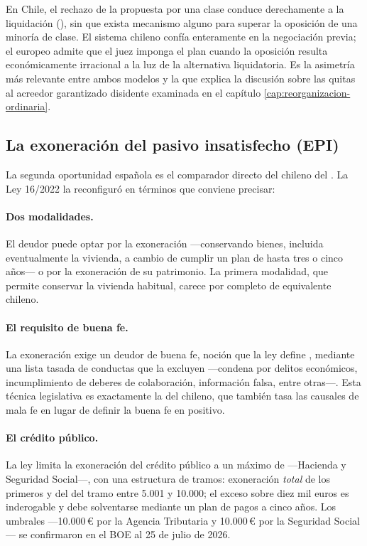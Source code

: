 \begin{alerta}
En Chile, el rechazo de la propuesta por una clase conduce derechamente a la liquidación
(), sin que exista mecanismo alguno para superar la oposición de una minoría de clase.
El sistema chileno confía enteramente en la negociación previa; el europeo admite que el juez
imponga el plan cuando la oposición resulta económicamente irracional a la luz de la alternativa
liquidatoria. Es la asimetría más relevante entre ambos modelos y la que explica la discusión sobre
las quitas al acreedor garantizado disidente examinada en el capítulo
\ref{cap:reorganizacion-ordinaria}.
\end{alerta}

\subsection{La exoneración del pasivo insatisfecho (EPI)}

La segunda oportunidad española es el comparador directo del \discharge{} chileno del . La
Ley 16/2022 la reconfiguró en términos que conviene precisar:

\paragraph{Dos modalidades.} El deudor puede optar por la exoneración
 ---conservando bienes, incluida eventualmente la vivienda, a cambio de
cumplir un plan de hasta tres o cinco años--- o por la exoneración
 de su patrimonio. La primera modalidad, que permite conservar la
vivienda habitual, carece por completo de equivalente chileno.

\paragraph{El requisito de buena fe.} La exoneración exige un deudor de buena fe, noción que la ley
define , mediante una lista tasada de conductas que la excluyen ---condena
por delitos económicos, incumplimiento de deberes de colaboración, información falsa, entre
otras---. Esta técnica legislativa es exactamente la del  chileno, que también tasa las
causales de mala fe en lugar de definir la buena fe en positivo.

\paragraph{El crédito público.} La ley limita la exoneración del crédito público a un máximo de
 ---Hacienda y Seguridad Social---, con una estructura de
tramos: exoneración \emph{total} de los primeros  y del
 del tramo entre 5.001 y 10.000; el exceso sobre diez mil euros es inderogable y
debe solventarse mediante un plan de pagos a cinco años. Los umbrales ---10.000\,€ por la Agencia
Tributaria y 10.000\,€ por la Seguridad Social--- se confirmaron en el BOE al 25 de julio de 2026.


